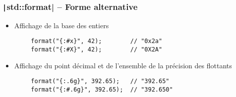 \documentclass[C++.tex]{subfiles}
\begin{document}
\begin{frame}[fragile]
	\frametitle{\texttt|std::format| -- Forme alternative}
	\begin{itemize}
		\item Affichage de la base des entiers
	\end{itemize}

	\begin{verbatim}
		format("{:#x}", 42);        // "0x2a"
		format("{:#X}", 42);        // "0X2A"
	\end{verbatim}

	\begin{itemize}
		\item Affichage du point décimal et de l'ensemble de la précision des flottants
	\end{itemize}

	\begin{verbatim}
		format("{:.6g}", 392.65);   // "392.65"
		format("{:#.6g}", 392.65);  // "392.650"
	\end{verbatim}


\end{frame}
\end{document}
